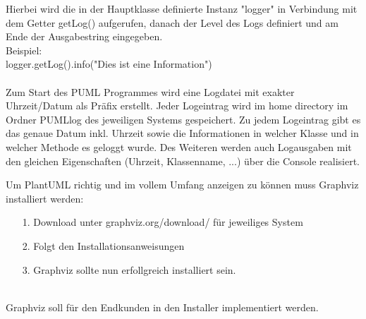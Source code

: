 Hierbei wird die in der Hauptklasse definierte Instanz "logger" in Verbindung mit dem Getter getLog() aufgerufen, danach der Level des Logs definiert und am Ende der Ausgabestring eingegeben.\\
Beispiel:\\
logger.getLog().info("Dies ist eine Information")\\
\\
Zum Start des PUML Programmes wird eine Logdatei mit exakter Uhrzeit/Datum als Präfix erstellt.
Jeder Logeintrag wird im home directory im Ordner PUMLlog des jeweiligen Systems gespeichert. Zu jedem Logeintrag gibt es das genaue Datum inkl. Uhrzeit sowie die Informationen in welcher Klasse und in welcher Methode es geloggt wurde.
Des Weiteren werden auch Logausgaben mit den gleichen Eigenschaften (Uhrzeit, Klassenname, ...) über die Console realisiert.
\nsecend %
\nsecend %

Um PlantUML richtig und im vollem Umfang anzeigen zu können muss Graphviz installiert werden:
\begin{itemize}
\item[1.] Download unter graphviz.org/download/ für jeweiliges System
\item[2.] Folgt den Installationsanweisungen
\item[3.] Graphviz sollte nun erfollgreich installiert sein.
\end{itemize}\\
Graphviz soll für den Endkunden in den Installer implementiert werden.
\nsecend %
\nsecend %

\nsecend %